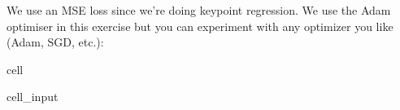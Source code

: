 \documentclass[letterpaper,10pt,english]{jupyterBook}
\begin{document}
\sphinxAtStartPar
We use an MSE loss since we’re doing keypoint regression. We use the Adam optimiser in this exercise but you can experiment with any optimizer you like (Adam, SGD, etc.):

\begin{sphinxuseclass}{cell}\begin{sphinxVerbatimInput}

\begin{sphinxuseclass}{cell_input}
\begin{sphinxVerbatim}[commandchars=\\\{\}]
 
  
 \PYG{p}{[}\PYG{p}{]}
  
    
   
\end{sphinxVerbatim}

\end{sphinxuseclass}\end{sphinxVerbatimInput}
\begin{sphinxVerbatimOutput}


\end{sphinxVerbatimOutput}
\end{sphinxuseclass}
\end{document}
